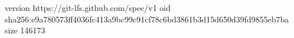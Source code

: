 version https://git-lfs.github.com/spec/v1
oid sha256:e9a780573ff4036fc413a9bc99c91cf78c6bd3861b3d15d650d39fd9855eb7ba
size 146173
